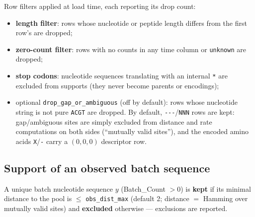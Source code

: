 \documentclass[11pt]{article}
\begin{document}
Row filters applied at load time, each reporting its drop count:
\begin{itemize}
\item \textbf{length filter}: rows whose nucleotide or peptide length
differs from the first row's are dropped;
\item \textbf{zero-count filter}: rows with no counts in any time column
or \texttt{unknown} are dropped;
\item \textbf{stop codons}: nucleotide sequences translating with an
internal \texttt{*} are excluded from supports (they never become parents
or encodings);
\item optional \texttt{drop\_gap\_or\_ambiguous} (off by default): rows
whose nucleotide string is not pure \texttt{ACGT} are dropped. By default,
\texttt{-{}-{}-}/\texttt{NNN} rows are kept: gap/ambiguous sites are simply
excluded from distance and rate computations on both sides (``mutually
valid sites''), and the encoded amino acids \texttt{X}/\texttt{-} carry a
$(0,0,0)$ descriptor row.
\end{itemize}

\subsection{Support of an observed batch sequence}\label{sec:support}

A unique batch nucleotide sequence $y$ (Batch\_Count $> 0$) is
\textbf{kept} if its minimal distance to the pool is $\le$
\texttt{obs\_dist\_max} (default 2; distance $=$ Hamming over mutually
valid sites) and \textbf{excluded} otherwise --- exclusions are reported.
\end{document}
